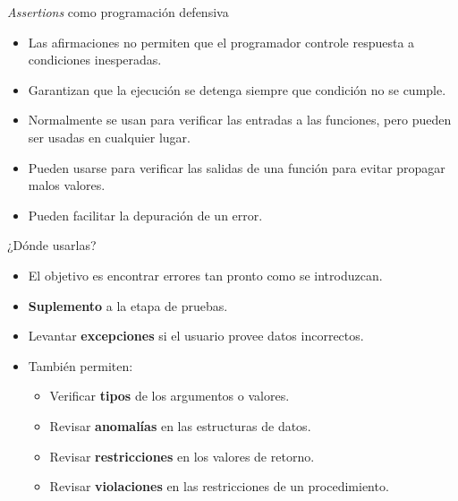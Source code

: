 \documentclass[mathserif]{beamer}
\begin{document}
\begin{frame}[fragile]{\textit{Assertions} como programación defensiva}
    \begin{itemize}
        \item Las afirmaciones no permiten que el programador controle respuesta a condiciones inesperadas.
        
        \item Garantizan que la {\blue ejecución se detenga} siempre que condición no se cumple.
        
        \item Normalmente se usan para {\blue verificar las entradas} a las funciones, pero pueden ser usadas en cualquier lugar.
        
        \item Pueden usarse para {\blue verificar las salidas} de una función para evitar propagar malos valores.
        
        \item Pueden facilitar la depuración de un error.
    \end{itemize}
\end{frame}

\begin{frame}[fragile]{¿Dónde usarlas?}
    \begin{itemize}
        \item El objetivo es encontrar errores tan pronto como se introduzcan.
        
        \item {\blue\bfseries Suplemento} a la etapa de pruebas.
        
        \item Levantar {\blue\bfseries excepciones} si el usuario provee datos incorrectos.
        
        \item También permiten: 
        \begin{itemize}
            \item Verificar {\blue\bfseries tipos} de los argumentos o valores.
            \item Revisar {\blue\bfseries anomalías} en las estructuras de datos.
            \item Revisar {\blue\bfseries restricciones} en los valores de retorno.
            \item Revisar {\blue\bfseries violaciones} en las restricciones de un procedimiento.
        \end{itemize}
    \end{itemize}
\end{frame}
\end{document}
